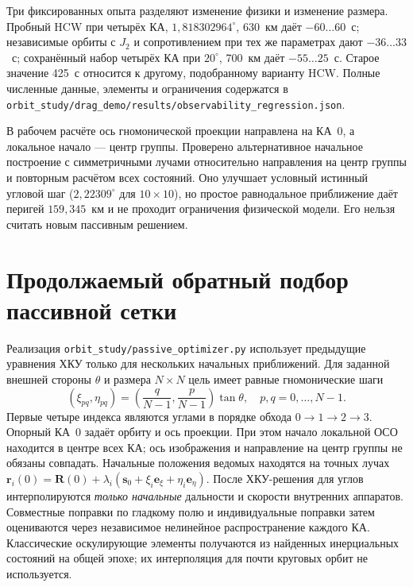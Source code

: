 \documentclass[a4paper,12pt]{article}
\begin{document}
Три фиксированных опыта разделяют изменение физики и изменение
размера. Пробный HCW при четырёх КА, $1{,}818302964^\circ$,
630~км даёт $-60\ldots60$~с; независимые орбиты с
$J_2$ и сопротивлением при тех же параметрах дают
$-36\ldots33$~с; сохранённый набор четырёх КА при
$20^\circ$, 700~км даёт $-55\ldots25$~с. Старое значение
425~с относится к другому, подобранному варианту HCW.
Полные численные данные, элементы и ограничения содержатся в
\texttt{orbit\_study/drag\_demo/results/observability\_regression.json}.

В рабочем расчёте ось гномонической проекции направлена на КА~0,
а локальное начало --- центр группы. Проверено альтернативное
начальное построение с симметричными лучами относительно направления
на центр группы и повторным расчётом всех состояний. Оно улучшает
условный истинный угловой шаг ($2{,}22309^\circ$ для $10\times10$),
но простое равнодальное приближение даёт перигей $159{,}345$~км
и не проходит ограничения физической модели. Его нельзя считать
новым пассивным решением.

\section{Продолжаемый обратный подбор пассивной сетки}

Реализация \texttt{orbit\_study/passive\_optimizer.py} использует
предыдущие уравнения ХКУ только для нескольких начальных приближений.
Для заданной внешней стороны $\theta$ и размера $N\times N$
цель имеет равные гномонические шаги
\begin{equation}
  (\xi_{pq},\eta_{pq})=
  \left(\frac{q}{N-1},\frac{p}{N-1}\right)\tan\theta,
  \quad p,q=0,\ldots,N-1.
\end{equation}
Первые четыре индекса являются углами в порядке обхода
$0\to1\to2\to3$. Опорный КА~0 задаёт орбиту и ось проекции.
При этом начало локальной ОСО находится в центре всех КА;
ось изображения и направление на центр группы не обязаны совпадать.
Начальные положения ведомых находятся на точных лучах
$\mathbf r_i(0)=\mathbf R(0)+\lambda_i
(\mathbf s_0+\xi_i\mathbf e_\xi+\eta_i\mathbf e_\eta)$.
После ХКУ-решения для углов интерполируются \emph{только начальные}
дальности и скорости внутренних аппаратов. Совместные поправки
по гладкому полю и индивидуальные поправки затем оцениваются
через независимое нелинейное распространение каждого КА.
Классические оскулирующие элементы получаются из найденных
инерциальных состояний на общей эпохе; их интерполяция для
почти круговых орбит не используется.
\end{document}
